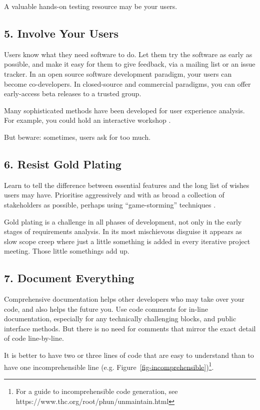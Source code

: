 \documentclass{bmcart}
\begin{document}
A valuable hands-on testing resource may be your users.  

\subsection*{5. Involve Your Users}

Users know what they need software to do. Let them try the software as early as possible, and make it easy for them to give feedback, via a mailing list or an issue tracker. In an open source software development paradigm, your users can become co-developers. In closed-source and commercial paradigms, you can offer early-access beta releases to a trusted group.  

Many sophisticated methods have been developed for user experience analysis. For example, you could hold an interactive workshop \cite{pavelin2014}. 

But beware: sometimes, users ask for too much. 

\subsection*{6. Resist Gold Plating}

Learn to tell the difference between essential features and the long list of wishes users may have. Prioritise aggressively and with as broad a collection of stakeholders as possible, perhaps using ``game-storming'' techniques \cite{gamestorm}.   

Gold plating is a challenge in all phases of development, not only in the early stages of requirements analysis. In its most mischievous disguise it appears as slow scope creep where just a little something is added in every iterative project meeting. Those little somethings add up. 

\subsection*{7. Document Everything}

Comprehensive documentation helps other developers who may take over your code, and also helps the future you. Use code comments for in-line documentation, especially for any technically challenging blocks, and public interface methods. But there is no need for comments that mirror the exact detail of code line-by-line. 

It is better to have two or three lines of code that are easy to understand than to have one incomprehensible line (e.g. Figure~\ref{fig-incomprehensible})\footnote{For a guide to incomprehensible code generation, see https://www.thc.org/root/phun/unmaintain.html}. 
\end{document}
